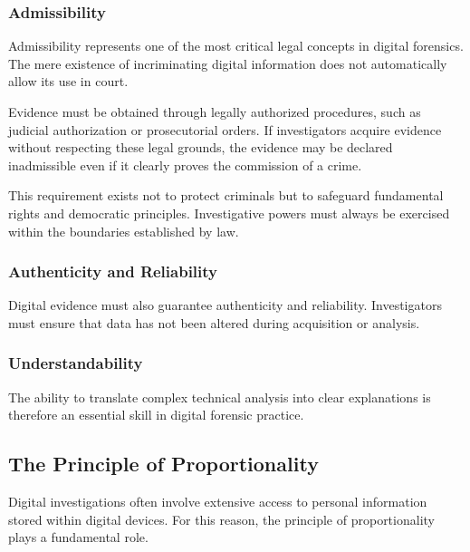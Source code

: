 \medskip

\subsubsection*{Admissibility}

\noindent
Admissibility represents one of the most critical legal concepts in digital forensics. The mere existence of incriminating digital information does not automatically allow its use in court.

\medskip

\noindent
Evidence must be obtained through legally authorized procedures, such as judicial authorization or prosecutorial orders. If investigators acquire evidence without respecting these legal grounds, the evidence may be declared inadmissible even if it clearly proves the commission of a crime.

\medskip

\noindent
This requirement exists not to protect criminals but to safeguard fundamental rights and democratic principles. Investigative powers must always be exercised within the boundaries established by law.

\medskip

\subsubsection*{Authenticity and Reliability}

\noindent
Digital evidence must also guarantee authenticity and reliability. Investigators must ensure that data has not been altered during acquisition or analysis.

\subsubsection*{Understandability}

The ability to translate complex technical analysis into clear explanations is therefore an essential skill in digital forensic practice.

\subsection{The Principle of Proportionality}

\noindent
Digital investigations often involve extensive access to personal information stored within digital devices. For this reason, the principle of proportionality plays a fundamental role.

